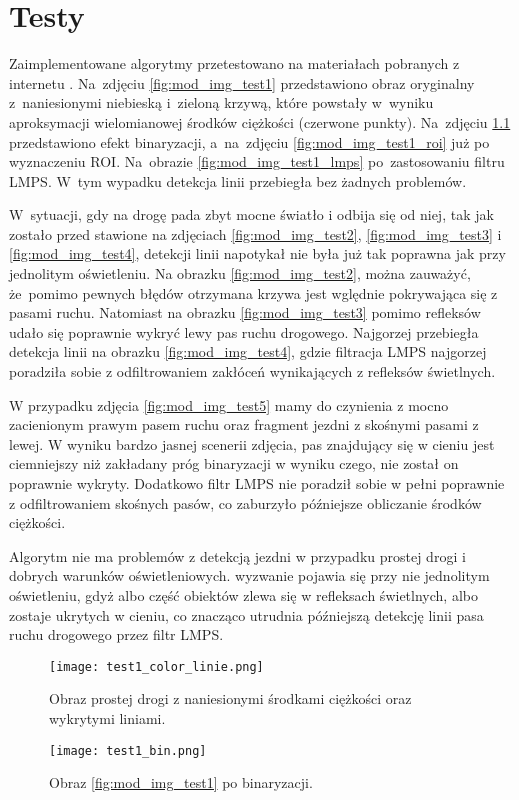 \chapter{Testy}

Zaimplementowane algorytmy przetestowano na materiałach pobranych z internetu \cite{Geiger2013IJRR}.
Na~zdjęciu \ref{fig:mod_img_test1} przedstawiono obraz oryginalny z~naniesionymi niebieską i~zieloną krzywą, które powstały w~wyniku aproksymacji wielomianowej środków ciężkości (czerwone punkty).
Na~zdjęciu \ref{fig:mod_img_test1_bin} przedstawiono efekt binaryzacji, a~na~zdjęciu \ref{fig:mod_img_test1_roi} już po wyznaczeniu ROI. Na~obrazie \ref{fig:mod_img_test1_lmps} po~zastosowaniu filtru LMPS. W~tym wypadku detekcja linii przebiegła bez żadnych problemów.

W~sytuacji, gdy na drogę pada zbyt mocne światło i odbija się od niej, tak jak zostało przed stawione na zdjęciach \ref{fig:mod_img_test2}, \ref{fig:mod_img_test3} i \ref{fig:mod_img_test4}, detekcji linii napotykał nie była już tak poprawna jak przy jednolitym oświetleniu.
Na obrazku \ref{fig:mod_img_test2}, można zauważyć, że~pomimo pewnych błędów otrzymana krzywa jest wględnie pokrywająca się z  pasami ruchu. Natomiast na obrazku \ref{fig:mod_img_test3} pomimo refleksów udało się poprawnie wykryć lewy pas ruchu drogowego.
Najgorzej przebiegła detekcja linii na obrazku \ref{fig:mod_img_test4}, gdzie filtracja LMPS najgorzej poradziła sobie z odfiltrowaniem zakłóceń wynikających z refleksów świetlnych.

W przypadku zdjęcia \ref{fig:mod_img_test5} mamy do czynienia z mocno zacienionym prawym pasem ruchu oraz fragment jezdni z skośnymi pasami z lewej. W wyniku bardzo jasnej scenerii zdjęcia, pas znajdujący się w cieniu jest ciemniejszy niż zakładany próg binaryzacji w wyniku czego, nie został on poprawnie wykryty. Dodatkowo filtr LMPS nie poradził sobie w pełni poprawnie z odfiltrowaniem skośnych pasów, co zaburzyło późniejsze obliczanie środków ciężkości.

Algorytm nie ma problemów z detekcją jezdni w przypadku prostej drogi i dobrych warunków oświetleniowych.
wyzwanie pojawia się przy nie jednolitym oświetleniu, gdyż albo część obiektów zlewa się w refleksach świetlnych, albo zostaje ukrytych w cieniu, co znacząco utrudnia późniejszą detekcję linii pasa ruchu drogowego przez filtr LMPS.

\begin{figure}[h]
	\begin{minipage}{0.48\textwidth}
		\centering
		\texttt{[image: test1\_color\_linie.png]}
		\caption{Obraz prostej drogi z naniesionymi środkami ciężkości oraz wykrytymi liniami.}
		\label{fig:mod_img_test1}
	\end{minipage}
	\begin{minipage}{0.48\textwidth}
		\centering
		\texttt{[image: test1\_bin.png]}
		\caption{Obraz \ref{fig:mod_img_test1} po binaryzacji.}
		\label{fig:mod_img_test1_bin}
	\end{minipage}
\end{figure}

